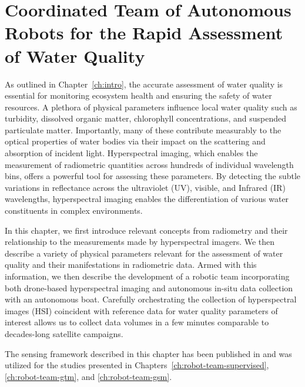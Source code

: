 \chapter{Coordinated Team of Autonomous Robots for the Rapid Assessment of Water
  Quality}\label{ch:robot-team}

As outlined in Chapter~\ref{ch:intro}, the accurate assessment of water
quality is essential for monitoring ecosystem health and ensuring the safety of
water resources. A plethora of physical parameters
influence local water quality such as turbidity, dissolved organic matter, chlorophyll
concentrations, and suspended particulate matter. Importantly, many of these
contribute measurably to the optical properties of water bodies via
their impact on the scattering and absorption of incident light. Hyperspectral
imaging, which enables the measurement of radiometric quantities
across hundreds of individual wavelength bins, offers a powerful tool for
assessing these parameters. By detecting the subtle variations in
reflectance across the ultraviolet (UV), visible, and Infrared (IR) wavelengths,
hyperspectral imaging enables the differentiation of various water constituents
in complex environments.

In this chapter, we first introduce relevant concepts from radiometry and their
relationship to the measurements made by hyperspectral imagers. We then
describe a variety of physical parameters relevant for the assessment of water
quality and their manifestations in radiometric data. Armed with this
information, we then describe the development of a robotic team incorporating both
drone-based hyperspectral imaging and autonomous in-situ data collection with an
autonomous boat. Carefully orchestrating the collection of hyperspectral
images (HSI) coincident with reference data for water quality parameters of
interest allows us to collect data volumes in a few minutes comparable to
decades-long satellite campaigns.

The sensing framework described in this chapter has been published in
\cite{robot-team-1} and was utilized for the studies presented in
Chapters~\ref{ch:robot-team-supervised}, \ref{ch:robot-team-gtm}, and \ref{ch:robot-team-gsm}.



